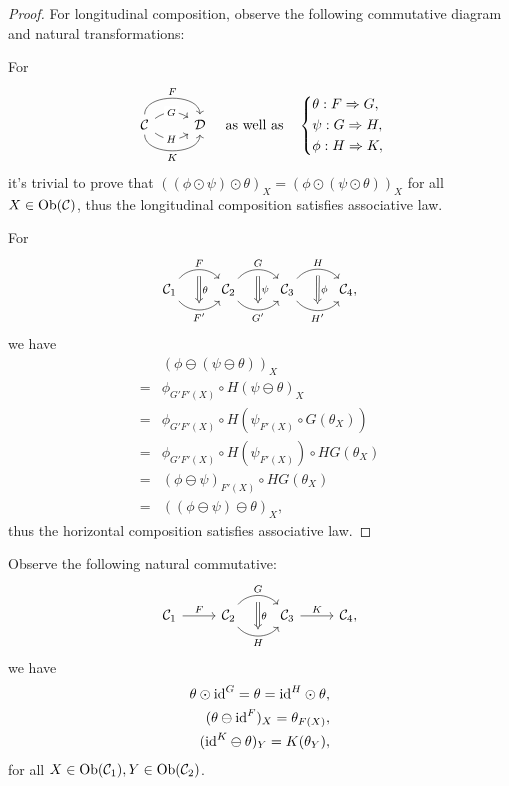 \documentclass{article}
\begin{document}
\begin{proof}
	For longitudinal composition, observe the following commutative diagram and natural transformations:

	For
	\[\begin{tikzcd}
		\C
			\arrow[r, bend left =90, "F"]
			\arrow[r, bend left =35, "G" description] 
			\arrow[r, bend right=35, "H" description]
			\arrow[r, bend right=90, "K"'] &
		\D
	\end{tikzcd}\quad\text{as well as}\quad
	\left\{\begin{aligned}
		& \theta:F\Rightarrow G,\\
		& \psi:G\Rightarrow H,\\
		& \phi:H\Rightarrow K,
	\end{aligned}\right.\]
	it's trivial to prove that $((\phi\odot\psi)\odot\theta)_X=(\phi\odot(\psi\odot\theta))_X$ for all $X\in \mathrm{Ob}(\mathcal{C})$, thus the longitudinal composition satisfies associative law.

	For
	\[\begin{tikzcd}
		\C_1 \arrow[bend left=50, r, "F", ""' name=F] \arrow[bend right=50, r, "F'"', "" name=F'] &
		\C_2 \arrow[bend left=50, r, "G", ""' name=G] \arrow[bend right=50, r, "G'"', "" name=G'] &	
		\C_3 \arrow[bend left=50, r, "H", ""' name=H] \arrow[bend right=50, r, "H'"', "" name=H'] &
		\arrow[Rightarrow, from=F, to=F', "\theta"]
		\arrow[Rightarrow, from=G, to=G', "\psi"]
		\arrow[Rightarrow, from=H, to=H', "\phi"]
		\C_4,
	\end{tikzcd}\]
	we have
	\begin{align}
		 & (\phi\ominus(\psi\ominus\theta))_X\tag{Assumption}\\
		=& \phi_{G'F'(X)}\circ H(\psi\ominus\theta)_X\tag{Def: horizontal composition}\\
		=& \phi_{G'F'(X)}\circ H(\psi_{F'(X)}\circ G(\theta_X))\tag{Ditto}\\
		=& \phi_{G'F'(X)}\circ H(\psi_{F'(X)})\circ HG(\theta_X)\tag{Property of functor $H$}\\
		=& (\phi\ominus\psi)_{F'(X)}\circ HG(\theta_X)\tag{Def: horizontal composition}\\
		=& ((\phi\ominus\psi)\ominus\theta)_X\tag{Ditto},
	\end{align}
	thus the horizontal composition satisfies associative law.
\end{proof}


\begin{thm}
	Observe the following natural commutative:
	\[\begin{tikzcd}
		\C_1 \arrow[r,"F"] &
		\C_2 \arrow[r, bend left =50, "G", ""' name=G] \arrow[r, bend right=50, "H"', "" name=H] &
		\C_3 \arrow[r, "K"] &
		\arrow[Rightarrow, from=G, to=H, "\theta"]
		\C_4,
	\end{tikzcd}\]
	we have
	\begin{align}
		\theta\odot\mathrm{id}^G=\theta=\mathrm{id}^H\odot\theta,\label{1}\\
		(\theta\ominus\mathrm{id}^F)_X=\theta_{F(X)},\label{2}\\
		(\mathrm{id}^K\ominus\theta)_Y=K(\theta_Y),\label{3}
	\end{align}
	for all $X\in\mathrm{Ob}(\mathcal{C}_1),Y\in\mathrm{Ob}(\mathcal{C}_2)$.
\end{thm}
\end{document}
